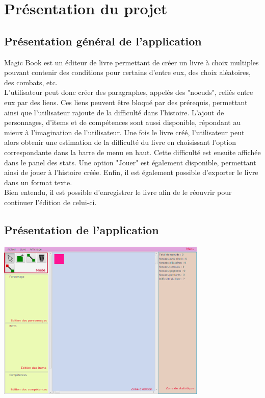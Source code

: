 \chapter{Présentation du projet}

	\section{Présentation général de l'application}
        Magic Book est un éditeur de livre permettant de créer un livre à choix multiples pouvant contenir des conditions pour certains d'entre eux, des choix aléatoires, des combats, etc.\\
        L'utilisateur peut donc créer des paragraphes, appelés des "noeuds", reliés entre eux par des liens. Ces liens peuvent être bloqué par des prérequis, permettant ainsi que l'utilisateur rajoute de la difficulté dans l'histoire. L'ajout de personnages, d'items et de compétences sont aussi disponible, répondant au mieux à l'imagination de l'utilisateur.
        Une fois le livre créé, l'utilisateur peut alors obtenir une estimation de la difficulté du livre en choisissant l'option correspondante dans la barre de menu en haut. Cette difficulté est ensuite affichée dans le panel des stats. Une option "Jouer" est également disponible, permettant ainsi de jouer à l'histoire créée. Enfin, il est également possible d'exporter le livre dans un format texte.\\
        Bien entendu, il est possible d'enregistrer le livre afin de le réouvrir pour continuer l'édition de celui-ci.\\

	\section{Présentation de l'application}

		\begin{center}
			\includegraphics[width=10cm]{img/magicBook.png}
		\end{center}

